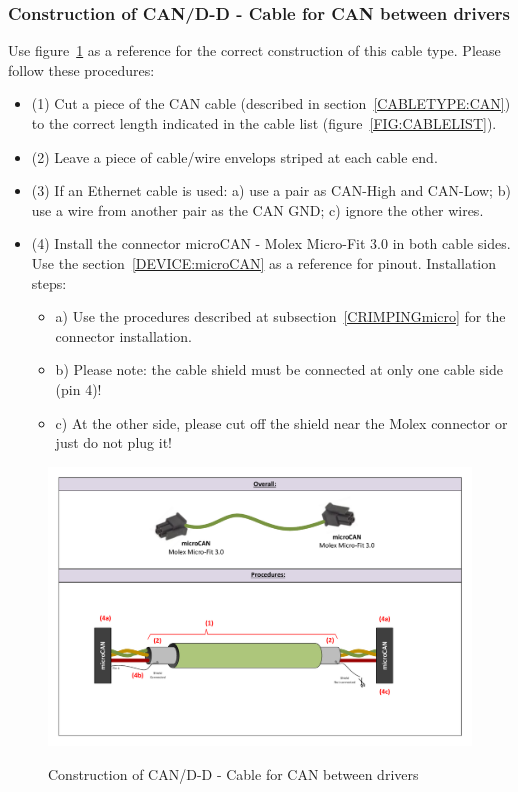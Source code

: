 \subsubsection{Construction of CAN/D-D - Cable for CAN between drivers} \label{CONSTRUCTION:CANDD}
Use figure~\ref{FIG:CANDDconstruction} as a reference for the correct construction of this cable type. Please follow these procedures:
\begin{itemize}
  \item (1) Cut a piece of the CAN cable (described in section~\ref{CABLETYPE:CAN}) to the correct length indicated in the cable list (figure~\ref{FIG:CABLELIST}).
  \item (2) Leave a piece of cable/wire envelops striped at each cable end.
  \item (3) If an Ethernet cable is used: a) use a pair as CAN-High and CAN-Low; b) use a wire from another pair as the CAN GND; c) ignore the other wires.
  \item (4) Install the connector microCAN - Molex Micro-Fit 3.0 in both cable sides. Use the section~\ref{DEVICE:microCAN} as a reference for pinout. Installation steps:
  \begin{itemize}
    \item a) Use the procedures described at subsection~\ref{CRIMPINGmicro} for the connector installation.
    \item b) Please note: the cable shield must be connected at only one cable side (pin 4)!
    \item c) At the other side, please cut off the shield near the Molex connector or just do not plug it!
  \end{itemize}
\end{itemize}
\begin{figure}
  \centering
  \includegraphics[angle=90,width=1\columnwidth]{figs/body03/FIGCANDDconstruction.pdf}\\
  \caption[Construction of CAN/D-D - Cable for CAN between drivers]{Construction of CAN/D-D - Cable for CAN between drivers}
  \label{FIG:CANDDconstruction}
\end{figure}

